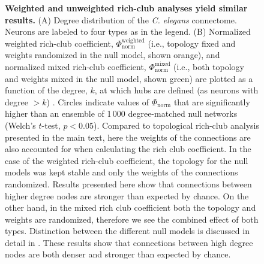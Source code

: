 \begin{figure}[h!]
 \caption{{\bf Weighted and unweighted rich-club analyses yield similar results.}
   (A) Degree distribution of the \emph{C. elegans} connectome.
    Neurons are labeled to four types as in the legend.
    (B)
    Normalized weighted rich-club coefficient, $\Phi_\mathrm{norm}^\mathrm{weighted}$ (i.e., topology fixed and weights randomized in the null model, shown orange), and
    normalized mixed rich-club coefficient, $\Phi_\mathrm{norm}^\mathrm{mixed}$ (i.e., both topology and weights mixed in the null model, shown green) are plotted as a function of the degree, $k$, at which hubs are defined (as neurons with degree $>k$) \citep{Alstott2014}.
    Circles indicate values of $\Phi_\mathrm{norm}$ that are significantly higher than an ensemble of 1\,000 degree-matched null networks (Welch's $t$-test, $p < 0.05$).
    Compared to topological rich-club analysis presented in the main text, here the weights of the connections are also accounted for when calculating the rich club coefficient.
    In the case of the weighted rich-club coefficient, the topology for the null models was kept stable and only the weights of the connections randomized. Results presented here show that connections between higher degree nodes are stronger than expected by chance.
    On the other hand, in the mixed rich club coefficient both the topology and weights are randomized, therefore we see the combined effect of both types.
    Distinction between the different null models is discussed in detail in \citep{Alstott2014}.
    These results show that connections between high degree nodes are both denser and stronger than expected by chance.}
\label{fig:Ch2S5_Fig}
\end{figure}


